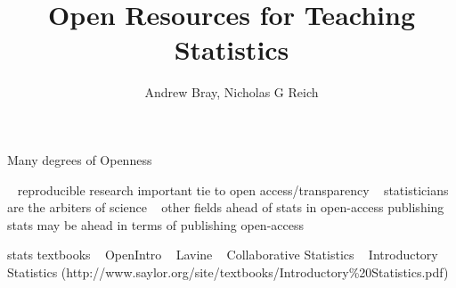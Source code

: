
\usepackage{multicol}

\title{Open Resources for Teaching Statistics }
\newcommand{\ModuleShortname}{}
\author{Andrew Bray, Nicholas G Reich}
\newcommand{\LicenseText}{Made available under the Creative Commons Attribution-ShareAlike 3.0 Unported License: http://creativecommons.org/licenses/by-sa/3.0/deed.en\textunderscore US }
\newcommand{\Instructor}{UMass-Amherst Probability and Statistics Seminar Series}
\newcommand{\Course}{7 April 2014}






\begin{frame}[plain]
	\titlepage
\end{frame}



\begin{frame}{Many degrees of Openness}

~ reproducible research important tie to open access/transparency
~ statisticians are the arbiters of science
~ other fields ahead of stats in open-access publishing
~ stats may be ahead in terms of publishing open-access


stats textbooks
~ OpenIntro
~ Lavine
~ Collaborative Statistics
~ Introductory Statistics (http://www.saylor.org/site/textbooks/Introductory\%20Statistics.pdf)

\end{frame}

